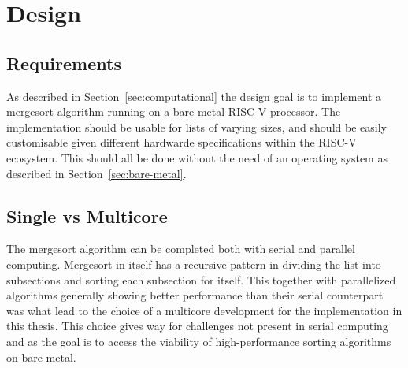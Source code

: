 \section{Design}\label{sec:Design}
\subsection{Requirements}
As described in Section~\ref{sec:computational} the design goal is to implement a
mergesort algorithm running on a bare-metal RISC-V processor. The implementation
should be usable for lists of varying sizes, and should be easily customisable
given different hardwarde specifications within the RISC-V ecosystem. This
should all be done without the need of an operating system as described in Section~\ref{sec:bare-metal}.


\subsection{Single vs Multicore}\label{sec:singlevsmulti}
The mergesort algorithm can be completed both with serial and parallel
computing. Mergesort in itself has a recursive pattern in dividing the list into
subsections and sorting each subsection for itself. This together with
parallelized algorithms generally showing better performance than their serial
counterpart was what lead to the choice of a multicore development for the
implementation in this thesis. \cite{comp_parallel} This choice gives way for
challenges not present in serial computing and as the goal is to access the
viability of high-performance sorting algorithms on bare-metal.




